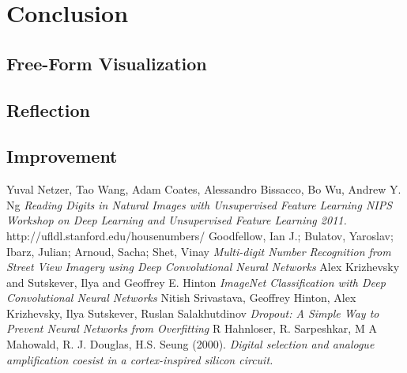 \documentclass[12pt]{article}
\begin{document}
\section{Conclusion}
\subsection{Free-Form Visualization}
\subsection{Reflection}
\subsection{Improvement}


\begin{thebibliography}{9}
Yuval Netzer, Tao Wang, Adam Coates, Alessandro Bissacco, Bo Wu, Andrew Y. Ng 
\textit{Reading Digits in Natural Images with Unsupervised Feature Learning NIPS Workshop on Deep Learning and Unsupervised Feature Learning 2011.}
http://ufldl.stanford.edu/housenumbers/
Goodfellow, Ian J.; Bulatov, Yaroslav; Ibarz, Julian; Arnoud, Sacha; Shet, Vinay
\textit{Multi-digit Number Recognition from Street View Imagery using Deep Convolutional Neural Networks}
Alex Krizhevsky and Sutskever, Ilya and Geoffrey E. Hinton
\textit{ImageNet Classification with Deep Convolutional Neural Networks}
Nitish Srivastava, Geoffrey Hinton, Alex Krizhevsky, Ilya Sutskever, Ruslan Salakhutdinov
\textit{Dropout: A Simple Way to Prevent Neural Networks from Overfitting}
R Hahnloser, R. Sarpeshkar, M A Mahowald, R. J. Douglas, H.S. Seung (2000). 
\textit{Digital selection and analogue amplification coesist in a cortex-inspired silicon circuit.}

\end{thebibliography}
	
\end{document}
